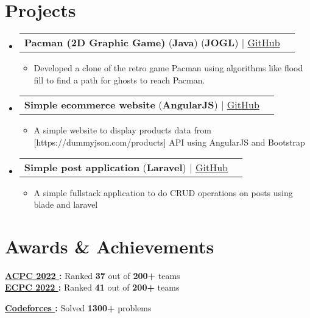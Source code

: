 \documentclass[a4paper,12pt]{article}
\makeatletter
\newcommand{\resumeItem}[1]{
  \item\small{
    {#1 \vspace{-2pt}}
  }
}
\newcommand{\resumeProjectHeading}[2]{
    \vspace{-2pt}\item
    \begin{tabular*}{0.97\textwidth}{l@{\extracolsep{\fill}}r}
      \small#1 & #2 \\
    \end{tabular*}\vspace{-7pt}
}
\newcommand{\resumeSubHeadingListStart}{\begin{itemize}[leftmargin=0.15in, label={}]}
\newcommand{\resumeSubHeadingListEnd}{\end{itemize}}
\newcommand{\resumeItemListStart}{\begin{itemize}}
\newcommand{\resumeItemListEnd}{\end{itemize}\vspace{-5pt}}
\makeatother
\begin{document}

\section{Projects}
\vspace{3pt}
\resumeSubHeadingListStart


\resumeProjectHeading
{\textbf{Pacman (2D Graphic Game)} (\textbf{Java}) (\textbf{JOGL}) $|$ \href{https://github.com/Yossef-Magdy/Pacman}{GitHub \faLink}}{}
\resumeItemListStart
\resumeItem{Developed a clone of the retro game Pacman using algorithms like flood fill to find a path for ghosts to reach Pacman.}
\resumeItemListEnd

\resumeProjectHeading
{\textbf{Simple ecommerce website} (\textbf{AngularJS}) $|$ \href{https://github.com/Yossef-Magdy/angular-ecommerce}{GitHub \faLink}}{}
\resumeItemListStart
\resumeItem{A simple website to display products data from [https://dummyjson.com/products] API using AngularJS and Bootstrap}
\resumeItemListEnd


\resumeProjectHeading
{\textbf{Simple post application} (\textbf{Laravel}) $|$ \href{https://github.com/Yossef-Magdy/laravel_lab}{GitHub \faLink}}{}
\resumeItemListStart
\resumeItem{A simple fullstack application to do CRUD operations on posts using blade and laravel}
\resumeItemListEnd

\resumeSubHeadingListEnd








\section{Awards \& Achievements}
  \vspace{2pt}
  \resumeSubHeadingListStart
    \small{\item{
        \textbf{\href{https://drive.google.com/file/d/1kxMcLRh3jysNW1Yy4loKLkkGkbccFPU_/view?usp=drive_link}{ACPC 2022 }:}
        {Ranked \textbf{37} out of \textbf{200+} teams} 
        \\ \vspace{3pt}
		\textbf{\href{https://drive.google.com/file/d/1p7HnOlci6spjWYa2FNIF-FpbT-O8zQ8h/view?usp=drive_link}{ECPC 2022 }:} 
		{Ranked \textbf{41} out of \textbf{200+} teams} 
		\\ \vspace{3pt}
		
		\textbf{{\href{https://codeforces.com/profile/Yossef}{Codeforces }}:}
		{Solved \textbf{1300+} problems} \\ 
		\vspace{3pt}
    }}
  \resumeSubHeadingListEnd
\end{document}
